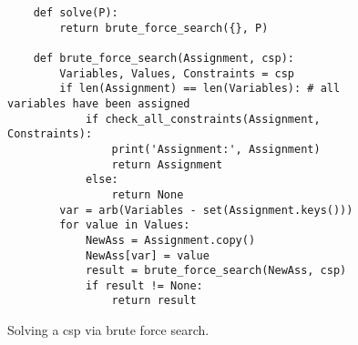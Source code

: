 \begin{figure}[!ht]
\centering
\begin{verbatim}
    def solve(P):
        return brute_force_search({}, P)

    def brute_force_search(Assignment, csp):
        Variables, Values, Constraints = csp
        if len(Assignment) == len(Variables): # all variables have been assigned
            if check_all_constraints(Assignment, Constraints):
                print('Assignment:', Assignment)
                return Assignment
            else:
                return None
        var = arb(Variables - set(Assignment.keys()))
        for value in Values:
            NewAss = Assignment.copy()
            NewAss[var] = value
            result = brute_force_search(NewAss, csp)
            if result != None:
                return result
\end{verbatim}
\vspace*{-0.3cm}
\caption{Solving a \ac{csp} via brute force search.}
\label{fig:Brute-Force-Solver.ipynb}
\end{figure}


